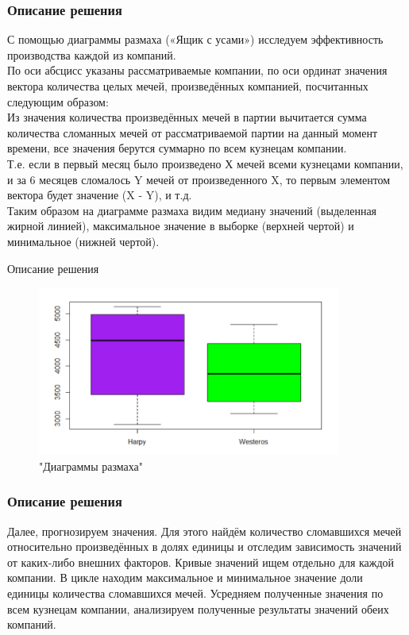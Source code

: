 \documentclass[9pt]{beamer}
\begin{document}
\begin{frame}
\frametitle{Описание решения}
С помощью диаграммы размаха («Ящик с усами») исследуем эффективность производства каждой из компаний.\\
По оси абсцисс указаны рассматриваемые компании, по оси ординат значения вектора количества целых мечей, произведённых компанией, посчитанных следующим образом:\\
Из значения количества произведённых мечей в партии вычитается сумма количества сломанных мечей от рассматриваемой партии на данный момент времени, все значения берутся суммарно по всем кузнецам компании.\\
Т.е. если в первый месяц было произведено Х мечей всеми кузнецами компании, и за 6 месяцев сломалось Y мечей от произведенного X, то первым элементом вектора будет значение (X - Y), и т.д.\\
Таким образом на диаграмме размаха видим медиану значений (выделенная жирной линией), максимальное значение в выборке (верхней чертой) и минимальное (нижней чертой). 
\end{frame}

\begin{frame}{Описание решения}	
	\begin{figure}[h]
		\includegraphics[width=100mm]{Graph.png}
		\caption{"Диаграммы размаха"}
		\label{Graph}
	\end{figure}
\end{frame}


\begin{frame}
\frametitle{Описание решения}
Далее, прогнозируем значения. Для этого найдём количество сломавшихся мечей относительно произведённых в долях единицы и отследим зависимость значений от каких-либо внешних факторов. Кривые значений ищем отдельно для каждой компании. В цикле находим максимальное и минимальное значение доли единицы количества сломавшихся мечей.
Усредняем полученные значения по всем кузнецам компании, анализируем полученные результаты значений обеих компаний.
\end{frame}
\end{document}
